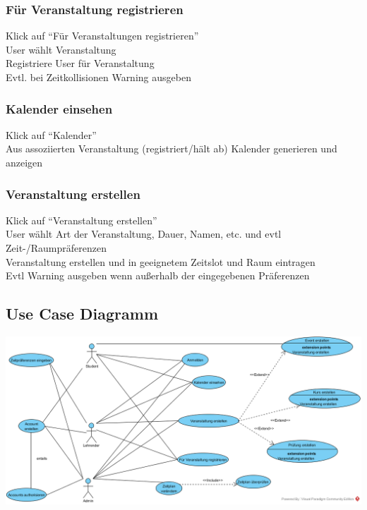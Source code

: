 \documentclass[a4paper,12pt]{article}
\begin{document}
	\subsubsection*{Für Veranstaltung registrieren}
		Klick auf “Für Veranstaltungen registrieren”\\
		User wählt Veranstaltung\\
		Registriere User für Veranstaltung\\
		Evtl. bei Zeitkollisionen Warning ausgeben\\
	\subsubsection*{Kalender einsehen}
		Klick auf “Kalender”\\
		Aus assoziierten Veranstaltung (registriert/hält ab) Kalender generieren und anzeigen
	\subsubsection*{Veranstaltung erstellen}
		Klick auf “Veranstaltung erstellen”\\
		User wählt Art der Veranstaltung, Dauer, Namen, etc. und evtl Zeit-/Raumpräferenzen\\
		Veranstaltung erstellen und in geeignetem Zeitslot und Raum eintragen\\
		Evtl Warning ausgeben wenn außerhalb der eingegebenen Präferenzen
	\subsection*{Use Case Diagramm}
	\begin{center}
		\includegraphics[scale=.5]{UseCaseDiagram.png}
	\end{center}
\end{document}
